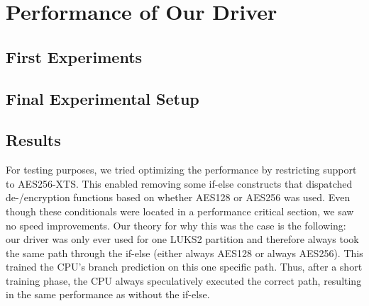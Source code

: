 \section{Performance of Our Driver}
\label{chap:performance}

\subsection{First Experiments}
\label{chap:performance.firstexperiments}

\subsection{Final Experimental Setup}
\label{chap:performance.finalsetup}

\subsection{Results}
\label{chap:performance.results}
For testing purposes, we tried optimizing the performance by restricting support to AES256-XTS. This enabled removing some if-else constructs that dispatched de-/encryption functions based on whether AES128 or AES256 was used. Even though these conditionals were located in a performance critical section, we saw no speed improvements. Our theory for why this was the case is the following: our driver was only ever used for one LUKS2 partition and therefore always took the same path through the if-else (either always AES128 or always AES256). This trained the CPU's branch prediction on this one specific path. Thus, after a short training phase, the CPU always speculatively executed the correct path, resulting in the same performance as without the if-else.